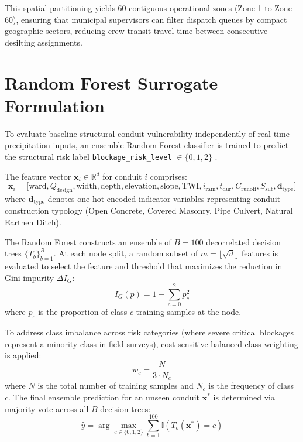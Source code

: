 This spatial partitioning yields 60 contiguous operational zones (Zone 1 to Zone 60), ensuring that municipal supervisors can filter dispatch queues by compact geographic sectors, reducing crew transit travel time between consecutive desilting assignments.

\section{Random Forest Surrogate Formulation}
To evaluate baseline structural conduit vulnerability independently of real-time precipitation inputs, an ensemble Random Forest classifier is trained to predict the structural risk label \texttt{blockage\_risk\_level} $\in \{0, 1, 2\}$ \cite{breiman2001random}.

The feature vector $\mathbf{x}_i \in \mathbb{R}^{d}$ for conduit $i$ comprises:
\begin{equation}
\mathbf{x}_i = \big[\text{ward}, Q_{\text{design}}, \text{width}, \text{depth}, \text{elevation}, \text{slope}, \text{TWI}, i_{\text{rain}}, t_{\text{dur}}, C_{\text{runoff}}, S_{\text{silt}}, \mathbf{d}_{\text{type}}\big]
\end{equation}
where $\mathbf{d}_{\text{type}}$ denotes one-hot encoded indicator variables representing conduit construction typology (Open Concrete, Covered Masonry, Pipe Culvert, Natural Earthen Ditch).

The Random Forest constructs an ensemble of $B = 100$ decorrelated decision trees $\{T_b\}_{b=1}^B$. At each node split, a random subset of $m = \lfloor\sqrt{d}\rfloor$ features is evaluated to select the feature and threshold that maximizes the reduction in Gini impurity $\Delta I_G$:
\begin{equation}
I_G(p) = 1 - \sum_{c=0}^2 p_c^2
\label{eqn:gini_impurity}
\end{equation}
where $p_c$ is the proportion of class $c$ training samples at the node. 

To address class imbalance across risk categories (where severe critical blockages represent a minority class in field surveys), cost-sensitive balanced class weighting is applied:
\begin{equation}
w_c = \frac{N}{3 \cdot N_c}
\label{eqn:class_weights}
\end{equation}
where $N$ is the total number of training samples and $N_c$ is the frequency of class $c$. The final ensemble prediction for an unseen conduit $\mathbf{x}^*$ is determined via majority vote across all $B$ decision trees:
\begin{equation}
\hat{y} = \arg\max_{c \in \{0, 1, 2\}} \sum_{b=1}^{100} \mathbb{I}\left(T_b(\mathbf{x}^*) = c\right)
\end{equation}

